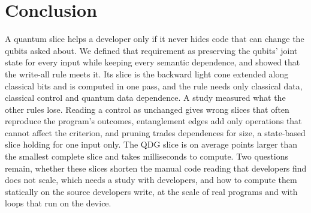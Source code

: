 \section{Conclusion}\label{sec:conclusion}

A quantum slice helps a developer only if it never hides code that can change the qubits asked about. We defined that
requirement as preserving the qubits' joint state for every input while keeping every semantic dependence, and showed
that the write-all rule meets it. Its slice is the backward light cone extended along classical bits and is computed in one pass, and the rule needs
only classical data, classical control and quantum data dependence. A study measured what the other rules lose. Reading a control as unchanged gives wrong slices that often reproduce the
program's outcomes, entanglement edges add only operations that cannot affect the criterion, and pruning trades dependences for size, a state-based slice holding for one
input only. The QDG slice is on average \numLcExcess{} points larger than the smallest complete slice and takes
milliseconds to compute. Two questions remain, whether these slices shorten the manual code reading that developers find does
not scale, which needs a study with developers, and how to compute them statically on the source developers write, at
the scale of real programs and with loops that run on the device.
